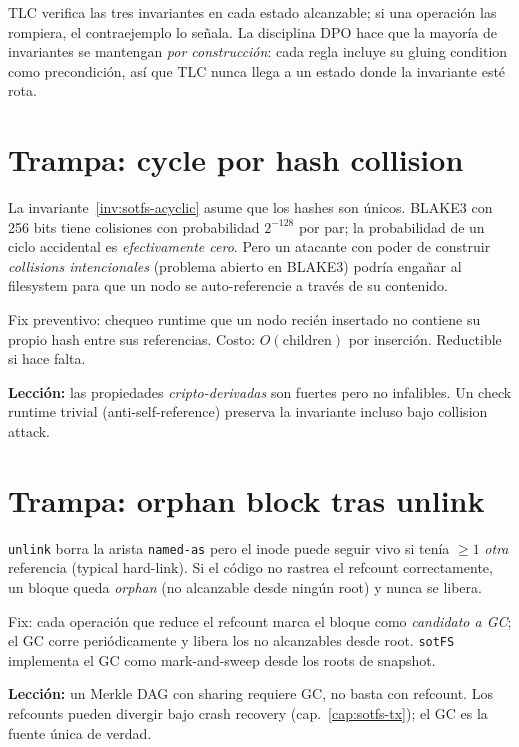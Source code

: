 TLC verifica las tres invariantes en cada estado alcanzable; si
una operación las rompiera, el contraejemplo lo señala. La
disciplina DPO hace que la mayoría de invariantes se mantengan
\emph{por construcción}: cada regla incluye su gluing condition
como precondición, así que TLC nunca llega a un estado donde la
invariante esté rota.

\section{Trampa: cycle por hash collision}

\begin{trampa}
La invariante~\ref{inv:sotfs-acyclic} asume que los hashes son
únicos. BLAKE3 con 256 bits tiene colisiones con probabilidad
$2^{-128}$ por par; la probabilidad de un ciclo accidental es
\emph{efectivamente cero}. Pero un atacante con poder de
construir \emph{collisions intencionales} (problema abierto en
BLAKE3) podría engañar al filesystem para que un nodo se
auto-referencie a través de su contenido.

Fix preventivo: chequeo runtime que un nodo recién insertado no
contiene su propio hash entre sus referencias. Costo: $O(\text{children})$
por inserción. Reductible si hace falta.

\textbf{Lección:} las propiedades \emph{cripto-derivadas} son
fuertes pero no infalibles. Un check runtime trivial (anti-self-reference)
preserva la invariante incluso bajo collision attack.
\end{trampa}

\section{Trampa: orphan block tras unlink}

\begin{trampa}
\texttt{unlink} borra la arista \texttt{named-as} pero el inode
puede seguir vivo si tenía $\geq 1$ \emph{otra} referencia
(typical hard-link). Si el código no rastrea el refcount
correctamente, un bloque queda \emph{orphan} (no alcanzable
desde ningún root) y nunca se libera.

Fix: cada operación que reduce el refcount marca el bloque como
\emph{candidato a GC}; el GC corre periódicamente y libera los
no alcanzables desde root. \texttt{sotFS} implementa el GC como
mark-and-sweep desde los roots de snapshot.

\textbf{Lección:} un Merkle DAG con sharing requiere GC, no
basta con refcount. Los refcounts pueden divergir bajo crash
recovery (cap.~\ref{cap:sotfs-tx}); el GC es la fuente única de
verdad.
\end{trampa}

